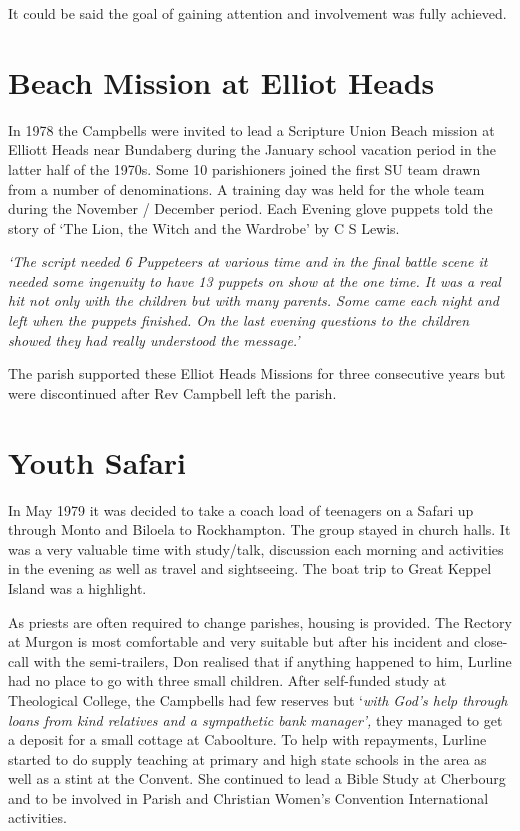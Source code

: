 \smallskip


It could be said the goal of gaining attention and involvement was fully achieved.



\section{Beach Mission at Elliot Heads}



In 1978 the Campbells were invited to lead a Scripture Union Beach mission at Elliott Heads near Bundaberg during the January school vacation period in the latter half of the 1970s. Some 10 parishioners joined the first SU team drawn from a number of denominations. A training day was held for the whole team during the November / December period. Each Evening glove puppets told the story of `The Lion, the Witch and the Wardrobe' by C S Lewis.



\emph{`The script needed 6 Puppeteers at various time and in the final battle scene it needed some ingenuity to have 13 puppets on show at the one time. It was a real hit not only with the children but with many parents. Some came each night and left when the puppets finished. On the last evening questions to the children showed they had really understood the message.'}



The parish supported these Elliot Heads Missions for three consecutive years but were discontinued after Rev Campbell left the parish.



\section{Youth Safari}



In May 1979 it was decided to take a coach load of teenagers on a Safari up through Monto and Biloela to Rockhampton. The group stayed in church halls. It was a very valuable time with study/talk, discussion each morning and activities in the evening as well as travel and sightseeing. The boat trip to Great Keppel Island was a highlight.



As priests are often required to change parishes, housing is provided. The Rectory at Murgon is most comfortable and very suitable but after his incident and close-call with the semi-trailers, Don realised that if anything happened to him, Lurline had no place to go with three small children. After self-funded study at Theological College, the Campbells had few reserves but `\emph{with God's help through loans from kind relatives and a sympathetic bank manager',} they managed to get a deposit for a small cottage at Caboolture. To help with repayments, Lurline started to do supply teaching at primary and high state schools in the area as well as a stint at the Convent. She continued to lead a Bible Study at Cherbourg and to be involved in Parish and Christian Women's Convention International activities.



